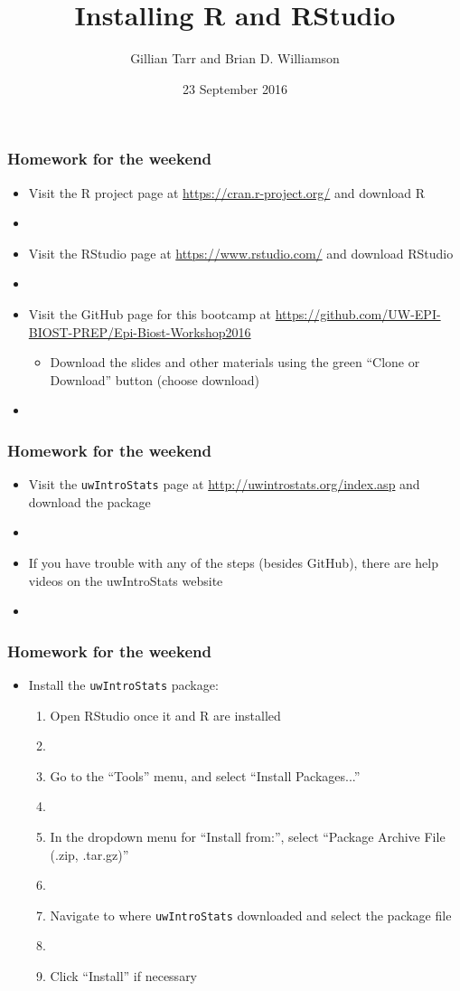 \documentclass[12pt]{beamer}
\title{Installing R and RStudio}
\author{Gillian Tarr and Brian D. Williamson}
\institute{EPI/BIOST Bootcamp 2016}
\date{23 September 2016}
\newcommand{\myframe}[1]{\begin{frame} \frametitle{#1}}
\begin{document}
\begin{frame}
\titlepage
\end{frame}

\myframe{Homework for the weekend}
\begin{itemize}
\item Visit the R project page at \url{https://cran.r-project.org/} and download R
\item[]
\item Visit the RStudio page at \url{https://www.rstudio.com/} and download RStudio
\item[]
\item Visit the GitHub page for this bootcamp at \url{https://github.com/UW-EPI-BIOST-PREP/Epi-Biost-Workshop2016}
\begin{itemize}
\item Download the slides and other materials using the green ``Clone or Download'' button (choose download)
\end{itemize}
\item[]
\end{itemize}
\end{frame}

\myframe{Homework for the weekend}
\begin{itemize}
\item Visit the \texttt{uwIntroStats} page at \url{http://uwintrostats.org/index.asp} and download the package
\item[]
\item If you have trouble with any of the steps (besides GitHub), there are help videos on the uwIntroStats website
\item[]
\end{itemize}
\end{frame}

\myframe{Homework for the weekend}
\begin{itemize}
\item Install the \texttt{uwIntroStats} package:
\begin{enumerate}
\item Open RStudio once it and R are installed
\item[]
\item Go to the ``Tools'' menu, and select ``Install Packages...''
\item[]
\item In the dropdown menu for ``Install from:'', select ``Package Archive File (.zip, .tar.gz)''
\item[]
\item Navigate to where \texttt{uwIntroStats} downloaded and select the package file
\item[]
\item Click ``Install'' if necessary
\end{enumerate}
\end{itemize}
\end{frame}
\end{document}

